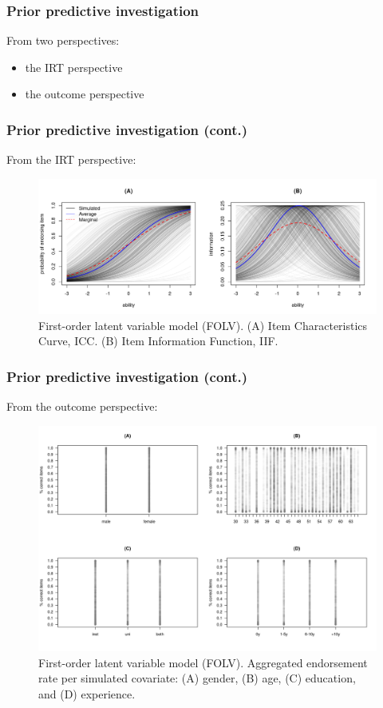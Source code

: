 \documentclass[arial,12pt,xcolor=dvipsnames]{beamer}
\begin{document}
%
\begin{frame}
	\frametitle{Prior predictive investigation}
	From two perspectives:
	\begin{itemize}
		\item the IRT perspective
		\item the outcome perspective
	\end{itemize}
\end{frame}
%
\begin{frame}
	\frametitle{Prior predictive investigation (cont.)}
	From the IRT perspective:
	\begin{figure}[H]
		\centering
		\includegraphics[width=1\linewidth]{FOLV_ICC_prior}
		\caption{First-order latent variable model (FOLV). (A) Item Characteristics Curve, ICC. (B) Item Information Function, IIF.}
		\label{fig:FOLV_ICC_prior}
	\end{figure} 
\end{frame}
%
\begin{frame}
	\frametitle{Prior predictive investigation (cont.)}
	From the outcome perspective:
	\begin{figure}[h]
		\centering
		\includegraphics[width=0.65\linewidth]{FOLV_HitRate2}
		\caption{First-order latent variable model (FOLV). Aggregated endorsement rate per simulated covariate: (A) gender, (B) age, (C) education, and (D) experience.}
		\label{fig:FOLV_hitrate2}
	\end{figure}
\end{frame}
\end{document}
